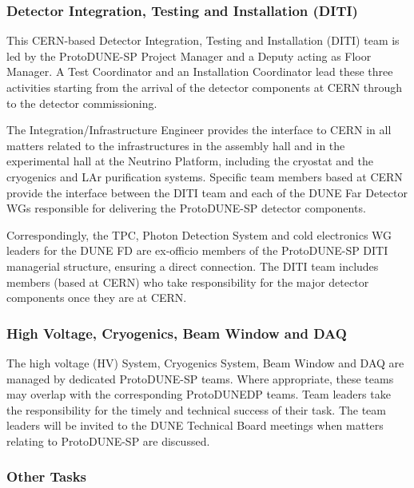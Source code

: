 \subsubsection{Detector Integration, Testing and Installation (DITI)}

This CERN-based Detector Integration, Testing and Installation (DITI) team is led by the ProtoDUNE-SP Project Manager and a Deputy acting as Floor Manager. A Test Coordinator and an Installation Coordinator lead these three activities starting from the arrival of the detector components at CERN through to the detector commissioning.

The Integration/Infrastructure Engineer provides the interface to CERN in all matters related to the infrastructures in the assembly hall and in the experimental hall at the Neutrino Platform, including the cryostat and the cryogenics and LAr purification systems.
Specific team members based at CERN provide the interface between the DITI team and each of the DUNE Far Detector WGs responsible for delivering the ProtoDUNE-SP detector components. 

Correspondingly, the TPC, Photon Detection System and cold electronics WG leaders for the DUNE FD are ex-officio members of the ProtoDUNE-SP DITI managerial structure, ensuring a direct connection. The DITI team includes members (based at CERN) who take responsibility for the major detector components once they are at CERN.

\subsubsection{High Voltage, Cryogenics, Beam Window and DAQ }

The high voltage (HV) System, Cryogenics System, Beam Window and DAQ are managed by dedicated ProtoDUNE-SP teams. Where appropriate, these teams may overlap with the corresponding ProtoDUNEDP teams. Team leaders take the responsibility for the timely and technical success of their task. The team leaders will be invited to the DUNE Technical Board meetings when matters relating to ProtoDUNE-SP are discussed.

\subsubsection{Other Tasks}

